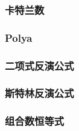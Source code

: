 \documentclass[twocolumn,a4]{article}
\newcommand{\addcpp}[1]{}
\begin{document}
		\subsubsection{卡特兰数}
		\subsubsection{Polya}
		\subsubsection{二项式反演公式}
		\subsubsection{斯特林反演公式}
		\subsubsection{组合数恒等式}
			
\end{document}
